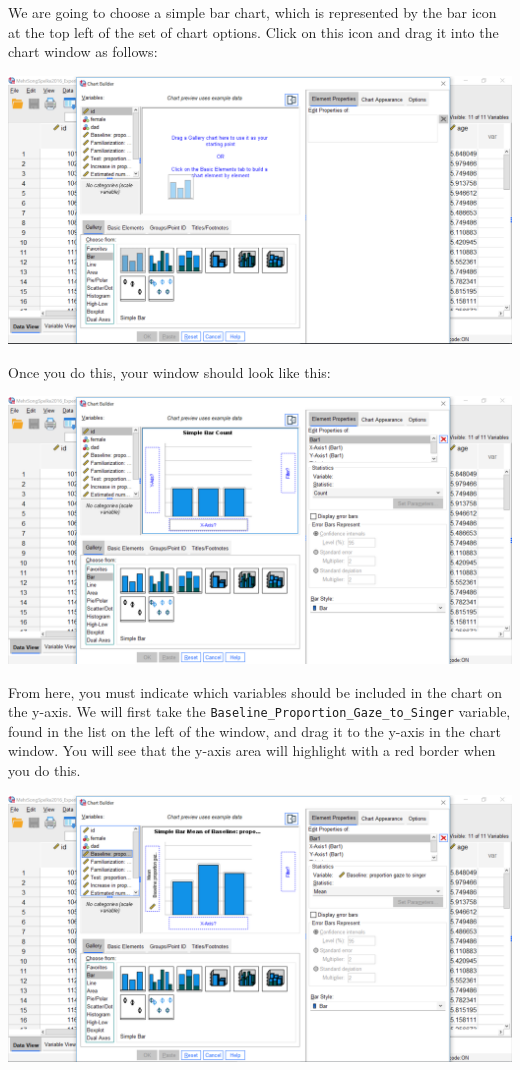 \documentclass[
]{book}
\begin{document}
We are going to choose a simple bar chart, which is represented by the bar icon at the top left of the set of chart options. Click on this icon and drag it into the chart window as follows:

\includegraphics{img/6.4.22.png}

Once you do this, your window should look like this:

\includegraphics{img/6.4.23.png}

From here, you must indicate which variables should be included in the chart on the y-axis. We will first take the \texttt{Baseline\_Proportion\_Gaze\_to\_Singer} variable, found in the list on the left of the window, and drag it to the y-axis in the chart window. You will see that the y-axis area will highlight with a red border when you do this.

\includegraphics{img/6.4.24.png}
\end{document}
